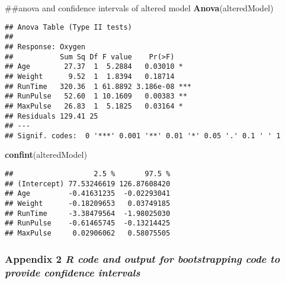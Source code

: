 \documentclass[]{article}
\newenvironment{Shaded}{\begin{snugshade}}{\end{snugshade}}
\newcommand{\KeywordTok}[1]{\textcolor[rgb]{0.13,0.29,0.53}{\textbf{#1}}}
\newcommand{\NormalTok}[1]{#1}
\begin{document}
\begin{Shaded}
\begin{Highlighting}[]
\NormalTok{##anova and confidence intervals of altered model}
\KeywordTok{Anova}\NormalTok{(alteredModel)}
\end{Highlighting}
\end{Shaded}

\begin{verbatim}
## Anova Table (Type II tests)
## 
## Response: Oxygen
##           Sum Sq Df F value    Pr(>F)    
## Age        27.37  1  5.2884   0.03010 *  
## Weight      9.52  1  1.8394   0.18714    
## RunTime   320.36  1 61.8892 3.186e-08 ***
## RunPulse   52.60  1 10.1609   0.00383 ** 
## MaxPulse   26.83  1  5.1825   0.03164 *  
## Residuals 129.41 25                      
## ---
## Signif. codes:  0 '***' 0.001 '**' 0.01 '*' 0.05 '.' 0.1 ' ' 1
\end{verbatim}

\begin{Shaded}
\begin{Highlighting}[]
\KeywordTok{confint}\NormalTok{(alteredModel)}
\end{Highlighting}
\end{Shaded}

\begin{verbatim}
##                   2.5 %       97.5 %
## (Intercept) 77.53246619 126.87608420
## Age         -0.41631235  -0.02293041
## Weight      -0.18209653   0.03749185
## RunTime     -3.38479564  -1.98025030
## RunPulse    -0.61465745  -0.13214425
## MaxPulse     0.02906062   0.58075505
\end{verbatim}

\pagebreak

\subsubsection{\texorpdfstring{Appendix 2 \emph{R code and output for
bootstrapping code to provide confidence
intervals}}{Appendix 2 R code and output for bootstrapping code to provide confidence intervals}}\label{appendix-2-r-code-and-output-for-bootstrapping-code-to-provide-confidence-intervals}
\end{document}
